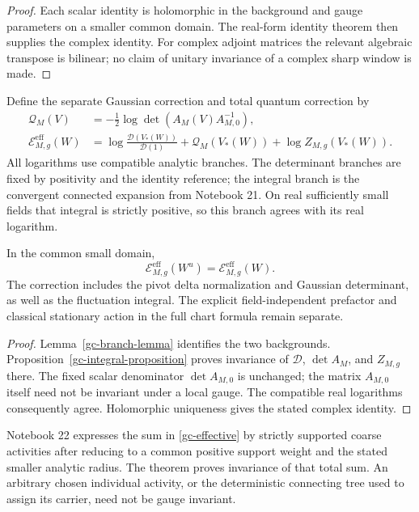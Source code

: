 \begin{proof}
Each scalar identity is holomorphic in the background and gauge
parameters on a smaller common domain. The real-form identity
theorem then supplies the complex identity. For complex adjoint
matrices the relevant algebraic transpose is bilinear; no claim
of unitary invariance of a complex sharp window is made.
\end{proof}

Define the separate Gaussian correction and total quantum correction by
\begin{align}
 \mathcal Q_M(V)&=-\tfrac12\log
                \det\!\left(A_M(V)A_{M,0}^{-1}\right),       \label{gc-q}\\
 \mathcal E_{M,g}^{\mathrm{eff}}(W)
   &=\log\frac{\mathcal D(V_*(W))}{\mathcal D(1)}
        +\mathcal Q_M(V_*(W))
        +\log Z_{M,g}(V_*(W)).                             \label{gc-effective}
\end{align}
All logarithms use compatible analytic branches. The determinant
branches are fixed by positivity and the identity reference;
the integral branch is the convergent connected expansion
from Notebook 21. On real sufficiently small fields that
integral is strictly positive, so this branch agrees with its
real logarithm.

\begin{theorem}
\label{gc-effective-theorem}
In the common small domain,
\begin{equation}\label{gc-effective-invariance}
 \mathcal E_{M,g}^{\mathrm{eff}}(W^u)
                      =\mathcal E_{M,g}^{\mathrm{eff}}(W).
\end{equation}
The correction includes the pivot delta normalization and Gaussian
determinant, as well as the fluctuation integral. The explicit
field-independent prefactor and classical stationary action in the
full chart formula remain separate.
\end{theorem}
\begin{proof}
Lemma~\ref{gc-branch-lemma} identifies the two backgrounds.
Proposition~\ref{gc-integral-proposition} proves invariance of
$\mathcal D$, $\det A_M$, and $Z_{M,g}$ there.
The fixed scalar denominator $\det A_{M,0}$ is unchanged;
the matrix $A_{M,0}$ itself need not be invariant under a local
gauge. The compatible real logarithms consequently agree.
Holomorphic uniqueness gives the stated complex identity.
\end{proof}

Notebook 22 expresses the sum in \eqref{gc-effective} by strictly
supported coarse activities after reducing to a common positive
support weight and the stated smaller analytic radius. The theorem
proves invariance of that total sum. An arbitrary chosen individual
activity, or the deterministic connecting tree used to assign its
carrier, need not be gauge invariant.

